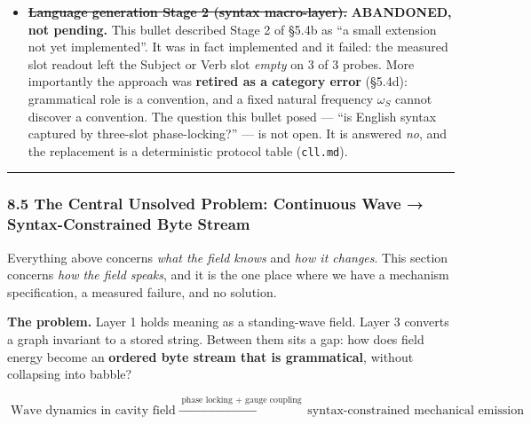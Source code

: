 \documentclass[
  11pt,
  a4paper,
]{article}
\begin{document}
\begin{itemize}
  Three \(O(E^2)\) defects on the ingest path were found and fixed while
  measuring this: \texttt{has\_edge} was a linear scan called from every
  \texttt{add\_edge} (making a bulk load quadratic),
  \texttt{would\_contradict} scanned all edges per asserted axiom, and
  four reasoning primitives performed their joins by full edge scan.
  Indexing them reduced load time by \(105\times\) at fixed output. None
  of this changes a claim in this paper; it changes what is runnable.
\item
  \st{\textbf{Language generation Stage 2 (syntax macro-layer).}}
  \textbf{ABANDONED, not pending.} This bullet described Stage 2 of
  §5.4b as ``a small extension not yet implemented''. It was in fact
  implemented and it failed: the measured slot readout left the Subject
  or Verb slot \emph{empty} on 3 of 3 probes. More importantly the
  approach was \textbf{retired as a category error} (§5.4d): grammatical
  role is a convention, and a fixed natural frequency \(\omega_S\)
  cannot discover a convention. The question this bullet posed --- ``is
  English syntax captured by three-slot phase-locking?'' --- is not
  open. It is answered \emph{no}, and the replacement is a deterministic
  protocol table (\texttt{cll.md}).
\end{itemize}

\begin{center}\rule{0.5\linewidth}{0.5pt}\end{center}

\subsubsection{8.5 The Central Unsolved Problem: Continuous Wave →
Syntax-Constrained Byte
Stream}\label{the-central-unsolved-problem-continuous-wave-syntax-constrained-byte-stream}

Everything above concerns \emph{what the field knows} and \emph{how it
changes}. This section concerns \emph{how the field speaks}, and it is
the one place where we have a mechanism specification, a measured
failure, and no solution.

\textbf{The problem.} Layer 1 holds meaning as a standing-wave field.
Layer 3 converts a graph invariant to a stored string. Between them sits
a gap: how does field energy become an \textbf{ordered byte stream that
is grammatical}, without collapsing into babble?

\[
\text{Wave dynamics in cavity field}
\;\xrightarrow{\;\text{phase locking + gauge coupling}\;}\;
\text{syntax-constrained mechanical emission}
\]
\end{document}
